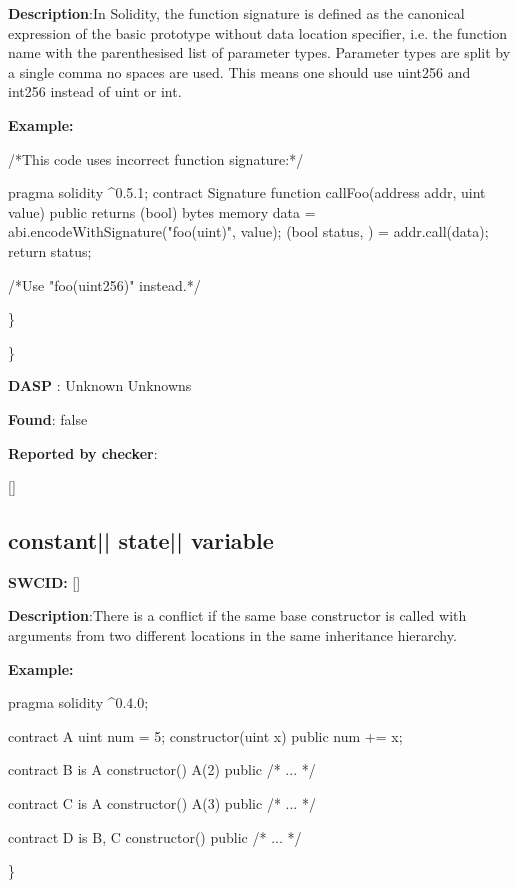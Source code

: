 \documentclass{article}
\begin{document}
\textbf{Description}:In Solidity, the function signature is defined as the canonical expression of the basic prototype without data location specifier, i.e. the function name with the parenthesised list of parameter types. Parameter types are split by a single comma {\textendash} no spaces are used. This means one should use uint256 and int256 instead of uint or int.


\textbf{Example:} 
\begin{ffcode} 

 /*This code uses incorrect function signature:*/ 

pragma solidity ^0.5.1;
contract Signature {
    function callFoo(address addr, uint value) public returns (bool) {
        bytes memory data = abi.encodeWithSignature("foo(uint)", value);
        (bool status, ) = addr.call(data);
        return status;
    }
}

/*Use "foo(uint256)" instead.*/

\end{ffcode} 
\} 

\} 

\textbf{DASP} : Unknown Unknowns

\textbf{Found}: false

\textbf{Reported by checker}: 
\begin{ffcode} 

[]
\end{ffcode} 
\subsection{constant{|\textunderscore| }state{|\textunderscore| }variable} 
\textbf{SWC{\textunderscore }ID:} []

\textbf{Description}:There is a conflict if the same base constructor is called with arguments from two different locations in the same inheritance hierarchy.


\textbf{Example:} 
\begin{ffcode} 

pragma solidity ^0.4.0;

contract A{
    uint num = 5;
    constructor(uint x) public{
        num += x;
    }
}

contract B is A{
    constructor() A(2) public { /* ... */ }
}

contract C is A {
    constructor() A(3) public { /* ... */ }
}

contract D is B, C {
    constructor() public { /* ... */ }
}

\end{ffcode} 
\} 
\end{document}
